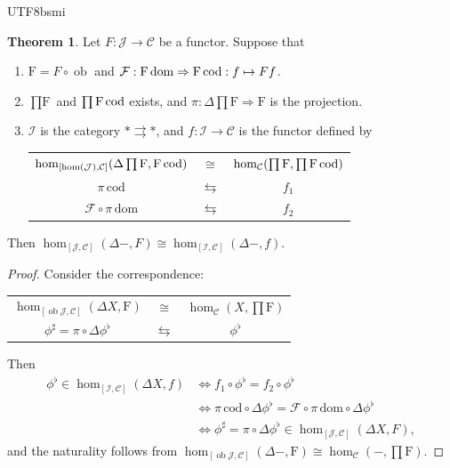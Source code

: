 \documentclass[12pt]{article}
\theoremstyle{definition}
\newtheorem{theorem}[definition]{Theorem}
\newcommand\<{\langle}
\renewcommand\>{\rangle}
\DeclareMathOperator{\ob}{ob}
\begin{document}
\begin{CJK}{UTF8}{bsmi}
\begin{theorem}
    Let $F:\mathcal{J}\to\mathcal{C}$ be a functor.
    Suppose that 
    \begin{enumerate}
        \item $\text{F}=F\circ\ob$ and $\mathcal{F}:\text{F\,dom}\Rightarrow\text{F\,cod}:f\mapsto Ff$.
        \item $\prod\text{F}$ and $\prod \text{F\,cod}$ exists, and $\pi:\Delta\prod \text{F}\Rightarrow\text{F}$ is the projection.
        \item $\mathcal{I}$ is the category $*\rightrightarrows*$, and $f:\mathcal{I}\to\mathcal{C}$ is the functor defined by
        \begin{center}
        \begin{tabular}{ccc}
            $\hom_{[\hom(\mathcal{J}), \mathcal{C}]}(\Delta\prod\text{F}, \text{F\,cod})$ & $\cong$ & $\hom_\mathcal{C}(\prod\text{F}, \prod \text{F\,cod})$ \\[2pt]
            $\pi\,\text{cod}$ & $\leftrightarrows$ & $f_1$ \\[2pt]
            $\mathcal{F}\circ\pi\,\text{dom}$ & $\leftrightarrows$ & $f_2$
        \end{tabular} 
        \end{center}
    \end{enumerate}
    Then $\hom_{[\mathcal{J}, \mathcal{C}]}(\Delta-, F)\cong\hom_{[\mathcal{I}, \mathcal{C}]}(\Delta-, f)$.
\end{theorem}
\begin{proof}
    Consider the correspondence:
        \begin{center}
        \begin{tabular}{ccc}
            $\hom_{[\ob\mathcal{J}, \mathcal{C}]}(\Delta X, \text{F})$ & $\cong$ & $\hom_\mathcal{C}(X, \prod\text{F})$ \\[2pt]
            $\phi^\sharp=\pi\circ\Delta\phi^\flat$ & $\leftrightarrows$ & $\phi^\flat$
        \end{tabular} 
        \end{center}
    Then
    \begin{align*}
        \phi^\flat\in\hom_{[\mathcal{I}, \mathcal{C}]}(\Delta X, f)
        & \iff f_1\circ\phi^\flat = f_2\circ\phi^\flat \\
        & \iff \pi\,\text{cod}\circ\Delta\phi^\flat = \mathcal{F}\circ\pi\,\text{dom}\circ\Delta\phi^\flat \\
        & \iff \phi^\sharp=\pi\circ\Delta\phi^\flat\in\hom_{[\mathcal{J}, \mathcal{C}]}(\Delta X, F),
    \end{align*}
    and the naturality follows from $\hom_{[\ob\mathcal{J}, \mathcal{C}]}(\Delta -,\text{F})\cong\hom_\mathcal{C}(-, \prod\text{F})$.
\end{proof}


\end{CJK}
\end{document}
